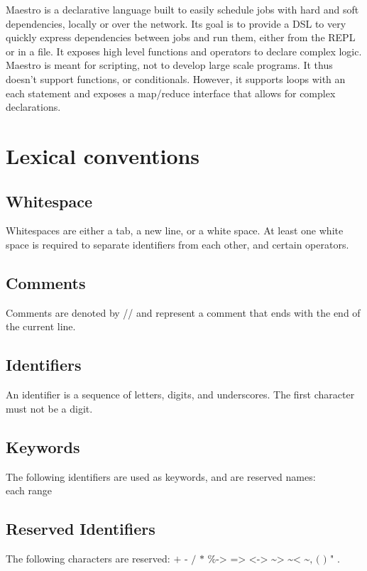 Maestro is a declarative language built to easily schedule jobs with hard and
soft dependencies, locally or over the network.  Its goal is to provide a DSL to
very quickly express dependencies between jobs and run them, either from the
REPL or in a file.  It exposes high level functions and operators to declare
complex logic. Maestro is meant for scripting, not to develop large scale
programs. It thus doesn't support functions, or conditionals. However, it
supports loops with an each statement and exposes a map/reduce interface that
allows for complex declarations.

\section{Lexical conventions}
\subsection{Whitespace}
Whitespaces are either a tab, a new line, or a white space. At least one white space is required to separate identifiers from
each other, and certain operators.

\subsection{Comments}
Comments are denoted by // and represent a comment that ends with the end of the current line.

\subsection{Identifiers}
An identifier is a sequence of letters, digits, and underscores. The first character must not be a digit.

\subsection{Keywords}
The following identifiers are used as keywords, and are reserved names:\\
each range

\subsection{Reserved Identifiers}
The following characters are reserved: $\texttt{+ - / * \% -> => <-> \textasciitilde>
\textasciitilde< \textasciitilde , ( ) " .}$

